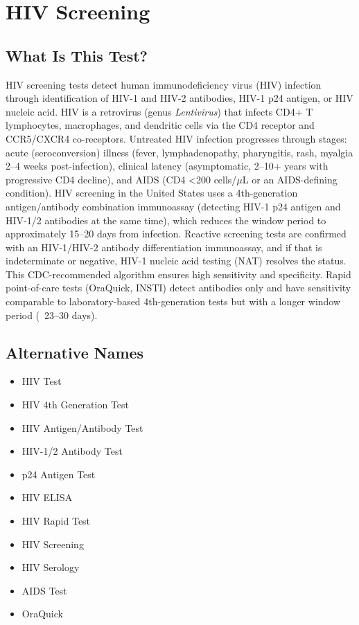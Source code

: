 \chapter{HIV Screening}

\section*{What Is This Test?}
HIV screening tests detect human immunodeficiency virus (HIV) infection through identification of HIV-1 and HIV-2 antibodies, HIV-1 p24 antigen, or HIV nucleic acid. HIV is a retrovirus (genus \textit{Lentivirus}) that infects CD4+ T lymphocytes, macrophages, and dendritic cells via the CD4 receptor and CCR5/CXCR4 co-receptors. Untreated HIV infection progresses through stages: acute (seroconversion) illness (fever, lymphadenopathy, pharyngitis, rash, myalgia 2--4 weeks post-infection), clinical latency (asymptomatic, 2--10+ years with progressive CD4 decline), and AIDS (CD4 <200 cells/$\mu$L or an AIDS-defining condition). HIV screening in the United States uses a 4th-generation antigen/antibody combination immunoassay (detecting HIV-1 p24 antigen and HIV-1/2 antibodies at the same time), which reduces the window period to approximately 15--20 days from infection. Reactive screening tests are confirmed with an HIV-1/HIV-2 antibody differentiation immunoassay, and if that is indeterminate or negative, HIV-1 nucleic acid testing (NAT) resolves the status. This CDC-recommended algorithm ensures high sensitivity and specificity. Rapid point-of-care tests (OraQuick, INSTI) detect antibodies only and have sensitivity comparable to laboratory-based 4th-generation tests but with a longer window period (~23--30 days).

\section*{Alternative Names}
\begin{itemize}
  \item HIV Test
  \item HIV 4th Generation Test
  \item HIV Antigen/Antibody Test
  \item HIV-1/2 Antibody Test
  \item p24 Antigen Test
  \item HIV ELISA
  \item HIV Rapid Test
  \item HIV Screening
  \item HIV Serology
  \item AIDS Test
  \item OraQuick
\end{itemize}
